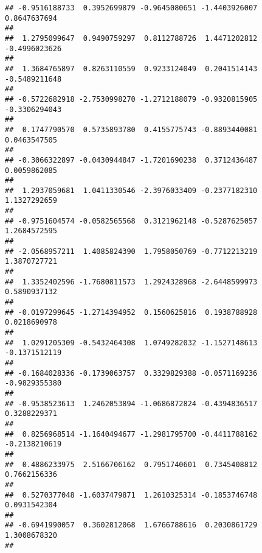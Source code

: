 \documentclass[]{article}
\begin{document}
\begin{verbatim}
## -0.9516188733  0.3952699879 -0.9645080651 -1.4403926007  0.8647637694 
##                                                                       
##  1.2795099647  0.9490759297  0.8112788726  1.4471202812 -0.4996023626 
##                                                                       
##  1.3684765897  0.8263110559  0.9233124049  0.2041514143 -0.5489211648 
##                                                                       
## -0.5722682918 -2.7530998270 -1.2712188079 -0.9320815905 -0.3306294043 
##                                                                       
##  0.1747790570  0.5735893780  0.4155775743 -0.8893440081  0.0463547505 
##                                                                       
## -0.3066322897 -0.0430944847 -1.7201690238  0.3712436487  0.0059862085 
##                                                                       
##  1.2937059681  1.0411330546 -2.3976033409 -0.2377182310  1.1327292659 
##                                                                       
## -0.9751604574 -0.0582565568  0.3121962148 -0.5287625057  1.2684572595 
##                                                                       
## -2.0568957211  1.4085824390  1.7958050769 -0.7712213219  1.3870727721 
##                                                                       
##  1.3352402596 -1.7680811573  1.2924328968 -2.6448599973  0.5890937132 
##                                                                       
## -0.0197299645 -1.2714394952  0.1560625816  0.1938788928  0.0218690978 
##                                                                       
##  1.0291205309 -0.5432464308  1.0749282032 -1.1527148613 -0.1371512119 
##                                                                       
## -0.1684028336 -0.1739063757  0.3329829388 -0.0571169236 -0.9829355380 
##                                                                       
## -0.9538523613  1.2462053894 -1.0686872824 -0.4394836517  0.3288229371 
##                                                                       
##  0.8256968514 -1.1640494677 -1.2981795700 -0.4411788162 -0.2138210619 
##                                                                       
##  0.4886233975  2.5166706162  0.7951740601  0.7345408812  0.7662156336 
##                                                                       
##  0.5270377048 -1.6037479871  1.2610325314 -0.1853746748  0.0931542304 
##                                                                       
## -0.6941990057  0.3602812068  1.6766788616  0.2030861729  1.3008678320 
##                                                                       

\end{verbatim}
\end{document}
